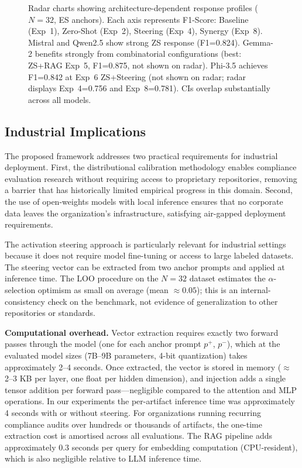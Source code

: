 \documentclass{ieeeaccess}
\begin{document}
\begin{figure}[htbp]
{
}%
\caption{Radar charts showing architecture-dependent response profiles ($N=32$, ES anchors). Each axis represents F1-Score: Baseline (Exp~1), Zero-Shot (Exp~2), Steering (Exp~4), Synergy (Exp~8). Mistral and Qwen2.5 show strong ZS response (F1=0.824). Gemma-2 benefits strongly from combinatorial configurations (best: ZS+RAG Exp~5, F1=0.875, not shown on radar). Phi-3.5 achieves F1=0.842 at Exp~6 ZS+Steering (not shown on radar; radar displays Exp~4=0.756 and Exp~8=0.781). CIs overlap substantially across all models.}
\label{fig:radar_charts}
\end{figure}

\subsection{Industrial Implications}

The proposed framework addresses two practical requirements for industrial deployment. First, the distributional calibration methodology enables compliance evaluation research without requiring access to proprietary repositories, removing a barrier that has historically limited empirical progress in this domain. Second, the use of open-weights models with local inference ensures that no corporate data leaves the organization's infrastructure, satisfying air-gapped deployment requirements.

The activation steering approach is particularly relevant for industrial settings because it does not require model fine-tuning or access to large labeled datasets. The steering vector can be extracted from two anchor prompts and applied at inference time. The LOO procedure on the $N=32$ dataset estimates the $\alpha$-selection optimism as small on average (mean $\approx 0.05$); this is an internal-consistency check on the benchmark, not evidence of generalization to other repositories or standards.

\textbf{Computational overhead.} Vector extraction requires exactly two forward passes through the model (one for each anchor prompt $p^+$, $p^-$), which at the evaluated model sizes (7B--9B parameters, 4-bit quantization) takes approximately 2--4 seconds. Once extracted, the vector is stored in memory ($\approx$2--3 KB per layer, one float per hidden dimension), and injection adds a single tensor addition per forward pass---negligible compared to the attention and MLP operations. In our experiments the per-artifact inference time was approximately 4 seconds with or without steering. For organizations running recurring compliance audits over hundreds or thousands of artifacts, the one-time extraction cost is amortised across all evaluations. The RAG pipeline adds approximately 0.3 seconds per query for embedding computation (CPU-resident), which is also negligible relative to LLM inference time.
\end{document}
